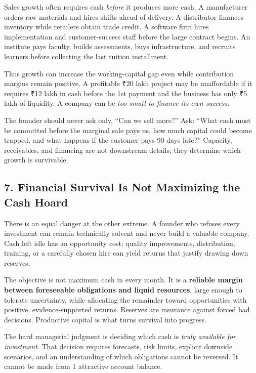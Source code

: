 Sales growth often requires cash \emph{before} it produces more cash. A manufacturer orders raw materials and hires shifts ahead of delivery. A distributor finances inventory while retailers obtain trade credit. A software firm hires implementation and customer-success staff before the large contract begins. An institute pays faculty, builds assessments, buys infrastructure, and recruits learners before collecting the last tuition installment.

Thus growth can increase the working-capital gap even while contribution margins remain positive. A profitable ₹20 lakh project may be unaffordable if it requires ₹12 lakh in cash before the 1st payment and the business has only ₹5 lakh of liquidity. A company can be \emph{too small to finance its own success}.

The founder should never ask only, ``Can we sell more?'' Ask: ``What cash must be committed before the marginal sale pays us, how much capital could become trapped, and what happens if the customer pays 90 days late?'' Capacity, receivables, and financing are not downstream details; they determine which growth is survivable.

\subsection*{7. Financial Survival Is Not Maximizing the Cash Hoard}

There is an equal danger at the other extreme. A founder who refuses every investment can remain technically solvent and never build a valuable company. Cash left idle has an opportunity cost; quality improvements, distribution, training, or a carefully chosen hire can yield returns that justify drawing down reserves.

The objective is not maximum cash in every month. It is a \textbf{reliable margin between foreseeable obligations and liquid resources}, large enough to tolerate uncertainty, while allocating the remainder toward opportunities with positive, evidence-supported returns. Reserves are insurance against forced bad decisions. Productive capital is what turns survival into progress.

The hard managerial judgment is deciding which cash is \emph{truly available for investment}. That decision requires forecasts, risk limits, explicit downside scenarios, and an understanding of which obligations cannot be reversed. It cannot be made from 1 attractive account balance.
